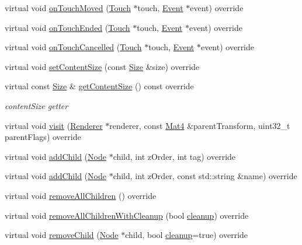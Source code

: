 \begin{DoxyCompactItemize}
virtual void \hyperlink{classScrollView_a0958fd1a06430212b3d3cbe26ce2bb9c}{on\+Touch\+Moved} (\hyperlink{classTouch}{Touch} $\ast$touch, \hyperlink{classEvent}{Event} $\ast$event) override
\item 
virtual void \hyperlink{classScrollView_a86f57715da926a475b75d67eff84701d}{on\+Touch\+Ended} (\hyperlink{classTouch}{Touch} $\ast$touch, \hyperlink{classEvent}{Event} $\ast$event) override
\item 
virtual void \hyperlink{classScrollView_a48d7dc926fdbd91707e37167dcf4d36f}{on\+Touch\+Cancelled} (\hyperlink{classTouch}{Touch} $\ast$touch, \hyperlink{classEvent}{Event} $\ast$event) override
\item 
virtual void \hyperlink{classScrollView_a3cf1d7fd072898e64498a7dc9c5932c1}{set\+Content\+Size} (const \hyperlink{classSize}{Size} \&size) override
\item 
virtual const \hyperlink{classSize}{Size} \& \hyperlink{classScrollView_a137f08e58505c253a4c3274c426200b2}{get\+Content\+Size} () const override
\begin{DoxyCompactList}\small\item\em content\+Size getter \end{DoxyCompactList}\item 
virtual void \hyperlink{classScrollView_a9766dfe15b34a8d7d1e3fd7b6acfcc32}{visit} (\hyperlink{classRenderer}{Renderer} $\ast$renderer, const \hyperlink{classMat4}{Mat4} \&parent\+Transform, uint32\+\_\+t parent\+Flags) override
\item 
virtual void \hyperlink{classScrollView_a36cedf4f110c025a6fc1196f6db3cd44}{add\+Child} (\hyperlink{classNode}{Node} $\ast$child, int z\+Order, int tag) override
\item 
virtual void \hyperlink{classScrollView_a29ff1f072b73708543aefc5f5983acba}{add\+Child} (\hyperlink{classNode}{Node} $\ast$child, int z\+Order, const std\+::string \&name) override
\item 
virtual void \hyperlink{classScrollView_aaef2d3ce7b1b7d485af4a3657bea17e5}{remove\+All\+Children} () override
\item 
virtual void \hyperlink{classScrollView_ac71d0fe89be6291abbccf6a6f8f011b4}{remove\+All\+Children\+With\+Cleanup} (bool \hyperlink{classNode_aa2de84c6cdeec9cd647d236c30ee0567}{cleanup}) override
\item 
virtual void \hyperlink{classScrollView_a678108e716966e8beccc25c0de1d9b29}{remove\+Child} (\hyperlink{classNode}{Node} $\ast$child, bool \hyperlink{classNode_aa2de84c6cdeec9cd647d236c30ee0567}{cleanup}=true) override

\end{DoxyCompactItemize}
